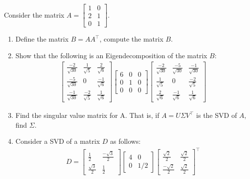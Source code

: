 Consider the matrix  $A = \begin{bmatrix} 1 & 0\\ 2  & 1 \\ 0 & 1 \end{bmatrix}$.

\begin{enumerate}
    \item Define the matrix $B = AA^{\top}$, compute the matrix $B$.

    \item Show that the following is an Eigendecomposition of the matrix $B$:
    \begin{align*}
      \begin{bmatrix} \frac{-2}{\sqrt{30}} & \frac{1}{\sqrt{5}} & \frac{2}{\sqrt{6}}\\ \frac{-5}{\sqrt{30}} & 0 & \frac{-1}{\sqrt{6}} \\ \frac{-1}{\sqrt{30}} & \frac{-2}{\sqrt{5}} & \frac{1}{\sqrt{6}} \end{bmatrix}
      \begin{bmatrix} 6 & 0 & 0\\ 0 & 1 & 0 \\ 0 & 0 & 0 \end{bmatrix}
      \begin{bmatrix} \frac{-2}{\sqrt{30}} & \frac{-5}{\sqrt{30}} & \frac{-1}{\sqrt{30}} \\ \frac{1}{\sqrt{5}} & 0 & \frac{-2}{\sqrt{5}} \\ \frac{2}{\sqrt{6}}  & \frac{-1}{\sqrt{6}} & \frac{1}{\sqrt{6}}  \end{bmatrix}
    \end{align*}

    \item Find the singular value matrix for A. That is, if $A = U \Sigma V^{\top}$ is the SVD of $A$, find $\Sigma$.

    \item Consider a SVD of a matrix $D$ as follows:
    \begin{align*}
        D = \begin{bmatrix} \frac{1}{2} & \frac{-\sqrt{3}}{2} \\ \frac{\sqrt{3}}{2} & \frac{1}{2} \end{bmatrix} \begin{bmatrix} 4 & 0 \\ 0 & 1/2 \end{bmatrix} 
        \begin{bmatrix} \frac{\sqrt{2}}{2} & \frac{\sqrt{2}}{2} \\ \frac{-\sqrt{2}}{2} & \frac{\sqrt{2}}{2} \end{bmatrix}^\top
    \end{align*}


\end{enumerate}
